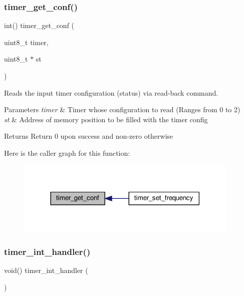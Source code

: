 \subsubsection{\texorpdfstring{timer\+\_\+get\+\_\+conf()}{timer\_get\_conf()}}
{\footnotesize\ttfamily int() timer\+\_\+get\+\_\+conf (\begin{DoxyParamCaption}\item[{uint8\+\_\+t}]{timer,  }\item[{uint8\+\_\+t $\ast$}]{st }\end{DoxyParamCaption})}



Reads the input timer configuration (status) via read-\/back command. 


\begin{DoxyParams}{Parameters}
{\em timer} & Timer whose configuration to read (Ranges from 0 to 2) \\
\hline
{\em st} & Address of memory position to be filled with the timer config \\
\hline
\end{DoxyParams}
\begin{DoxyReturn}{Returns}
Return 0 upon success and non-\/zero otherwise 
\end{DoxyReturn}
Here is the caller graph for this function\+:
\nopagebreak
\begin{figure}[H]
\begin{center}
\leavevmode
\includegraphics[width=302pt]{group__timer_ga703c60b40c8c49607d6ecb6fef82d27a_icgraph}
\end{center}
\end{figure}
\mbox{\label{group__timer_ga91a2072306c68353712a6b771287dc2c}} 
\subsubsection{\texorpdfstring{timer\+\_\+int\+\_\+handler()}{timer\_int\_handler()}}
{\footnotesize\ttfamily void() timer\+\_\+int\+\_\+handler (\begin{DoxyParamCaption}{ }\end{DoxyParamCaption})}



